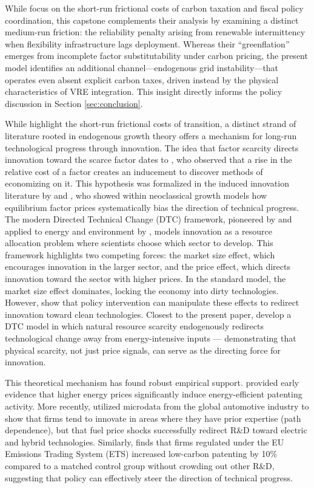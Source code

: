 \documentclass[12pt, a4paper]{article}
\begin{document}
While \citet{airaudo2025green} focus on the short-run frictional costs of carbon taxation and fiscal policy coordination, this capstone complements their analysis by examining a distinct medium-run friction: the reliability penalty arising from renewable intermittency when flexibility infrastructure lags deployment. Whereas their ``greenflation'' emerges from incomplete factor substitutability under carbon pricing, the present model identifies an additional channel---endogenous grid instability---that operates even absent explicit carbon taxes, driven instead by the physical characteristics of VRE integration. This insight directly informs the policy discussion in Section \ref{sec:conclusion}.

While \citet{airaudo2025green} highlight the short-run frictional costs of transition, a distinct strand of literature rooted in endogenous growth theory offers a mechanism for long-run technological progress through innovation. The idea that factor scarcity directs innovation toward the scarce factor dates to \citet{hicks1932}, who observed that a rise in the relative cost of a factor creates an inducement to discover methods of economizing on it. This hypothesis was formalized in the induced innovation literature by \citet{kennedy1964} and \citet{drandakisphelps1966}, who showed within neoclassical growth models how equilibrium factor prices systematically bias the direction of technical progress. The modern Directed Technical Change (DTC) framework, pioneered by \citet{acemoglu2002} and applied to energy and environment by \citet{acemoglu2012environment}, models innovation as a resource allocation problem where scientists choose which sector to develop. This framework highlights two competing forces: the market size effect, which encourages innovation in the larger sector, and the price effect, which directs innovation toward the sector with higher prices. In the standard model, the market size effect dominates, locking the economy into dirty technologies. However, \citet{acemoglu2012environment} show that policy intervention can manipulate these effects to redirect innovation toward clean technologies. Closest to the present paper, \citet{hassler2021} develop a DTC model in which natural resource scarcity endogenously redirects technological change away from energy-intensive inputs --- demonstrating that physical scarcity, not just price signals, can serve as the directing force for innovation.

This theoretical mechanism has found robust empirical support. \citet{popp2002} provided early evidence that higher energy prices significantly induce energy-efficient patenting activity. More recently, \citet{aghion2016} utilized microdata from the global automotive industry to show that firms tend to innovate in areas where they have prior expertise (path dependence), but that fuel price shocks successfully redirect R\&D toward electric and hybrid technologies. Similarly, \citet{calel2016} finds that firms regulated under the EU Emissions Trading System (ETS) increased low-carbon patenting by 10\% compared to a matched control group without crowding out other R\&D, suggesting that policy can effectively steer the direction of technical progress.
\end{document}
